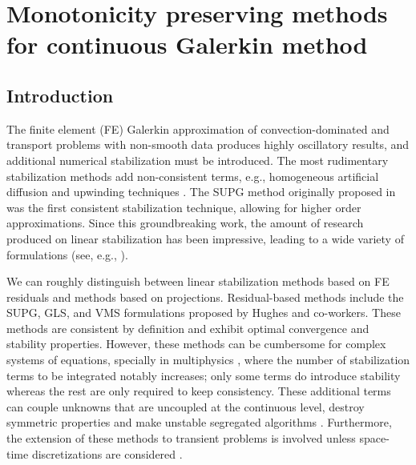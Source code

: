 \chapter{Monotonicity preserving methods for continuous Galerkin method}
\label{chap-paper1}
\section{Introduction}\label{s-intro}
%

The finite element (FE) Galerkin approximation of convection-dominated and transport problems
with non-smooth data produces highly oscillatory results, and additional numerical stabilization must be
introduced. The most rudimentary stabilization methods add non-consistent terms, e.g., homogeneous artificial diffusion and upwinding techniques \cite{von_neumann_method_1950}. 
The SUPG method originally proposed in \cite{brooks_streamline_1982} was the first consistent stabilization technique, 
allowing for higher order approximations. Since this groundbreaking
work, the amount of research produced on linear stabilization has been impressive, leading to a wide 
variety of formulations (see, e.g., \cite{hughes_variational_1998,codina_finite_1997,becker_finite_2001,guermond_stabilization_1999}). 

We can roughly distinguish between linear stabilization methods based on FE residuals 
and methods based on projections. Residual-based methods include the
SUPG, GLS, and VMS formulations \cite{hughes_multiscale_1995,hughes_variational_1998} proposed by Hughes and co-workers. These
methods are consistent by definition and exhibit optimal convergence and stability properties.
However, these methods can be cumbersome for complex systems of equations, specially
in multiphysics \cite{planas_approximation_2011,badia_unconditionally_2013}, where the number of stabilization terms to be integrated 
notably increases; only some terms do introduce stability whereas the rest are only required
to keep consistency. These additional terms can couple unknowns that are uncoupled
at the con\-ti\-nuous level, destroy symmetric properties and  make unstable segregated
algorithms \cite{badia_unconditionally_2013}. Furthermore, the extension of these methods to transient problems is
involved unless space-time discretizations are considered \cite{codina_time_2007,burman_consistent_2010}. 


